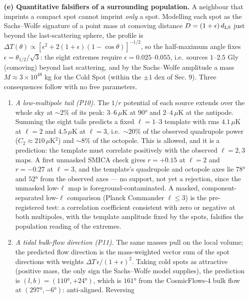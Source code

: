 \documentclass[
]{article}
\begin{document}
\textbf{(e) Quantitative falsifiers of a surrounding population.} A
neighbour that imprints a compact spot cannot imprint \emph{only} a
spot. Modelling each spot as the Sachs--Wolfe signature of a point mass
at comoving distance \(D = (1+\epsilon)\,d_{\rm LS}\) just beyond the
last-scattering sphere, the profile is
\(\Delta T(\theta) \propto [\epsilon^2 + 2(1+\epsilon)(1-\cos\theta)]^{-1/2}\),
so the half-maximum angle fixes \(\epsilon = \theta_{1/2}/\sqrt{3}\):
the eight extremes require \(\epsilon = 0.025\)--\(0.055\), i.e.~sources
\(1\)--\(2.5\) Gly (comoving) beyond last scattering, and by the
Sachs--Wolfe amplitude a mass \(M \approx 3\times10^{48}\) kg for the
Cold Spot (within the \(\pm1\) dex of Sec. 9). Three consequences follow
with no free parameters.

\begin{enumerate}
\def\labelenumi{\arabic{enumi}.}
\item
  \emph{A low-multipole tail (P10).} The \(1/r\) potential of each
  source extends over the whole sky at \(\sim\!2\%\) of its peak:
  \(3\)--\(6\,\mu\)K at \(90°\) and \(2\)--\(4\,\mu\)K at the antipode.
  Summing the eight tails predicts a fixed \(\ell = 1\)--\(3\) template
  with rms \(4.1\,\mu\)K at \(\ell=2\) and \(4.5\,\mu\)K at \(\ell=3\),
  i.e.~\(\sim\!20\%\) of the observed quadrupole power
  (\(C_2 \approx 210\,\mu\)K\(^2\)) and \(\sim\!8\%\) of the octopole.
  This is allowed, and it is a prediction: the template must correlate
  positively with the observed \(\ell = 2, 3\) maps. A first unmasked
  SMICA check gives \(r = +0.15\) at \(\ell=2\) and \(r = -0.27\) at
  \(\ell=3\), and the template's quadrupole and octopole axes lie
  \(78°\) and \(52°\) from the observed axes --- no support, not yet a
  rejection, since the unmasked low-\(\ell\) map is
  foreground-contaminated. A masked, component-separated low-\(\ell\)
  comparison (Planck Commander \(\ell \le 3\)) is the pre-registered
  test: a correlation coefficient consistent with zero or negative at
  both multipoles, with the template amplitude fixed by the spots,
  falsifies the population reading of the extremes.
\item
  \emph{A tidal bulk-flow direction (P11).} The same masses pull on the
  local volume; the predicted flow direction is the mass-weighted vector
  sum of the spot directions with weights
  \(\Delta T\,\epsilon/(1+\epsilon)^2\). Taking cold spots as attractive
  (positive mass, the only sign the Sachs--Wolfe model supplies), the
  prediction is \((l,b) = (110°, +24°)\), which is \(161°\) from the
  CosmicFlows-4 bulk flow at \((297°, -6°)\): anti-aligned. Reversing

\end{enumerate}
\end{document}

